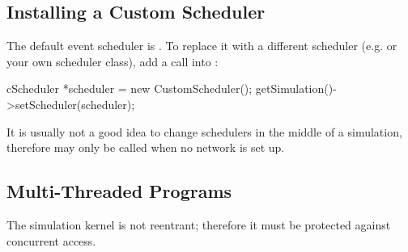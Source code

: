 \subsection{Installing a Custom Scheduler}
\label{sec:embedding:installing-a-custom-scheduler}

The default event scheduler is . To replace
it with a different scheduler (e.g.  or your
own scheduler class), add a  call into :

\begin{cpp}
cScheduler *scheduler = new CustomScheduler();
getSimulation()->setScheduler(scheduler);
\end{cpp}

It is usually not a good idea to change schedulers in the middle of
a simulation, therefore  may only be called when
no network is set up.


\subsection{Multi-Threaded Programs}
\label{sec:embedding:multi-threaded-programs}

The {\opp} simulation kernel is not reentrant; therefore it must be protected
against concurrent access.



